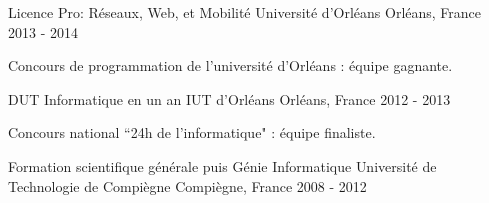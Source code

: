 \begin{cventries}
  \cventry
    {Licence Pro: Réseaux, Web, et Mobilité}
    {Université d'Orléans}
    {Orléans, France}
    {2013 - 2014}
    {
      \begin{cvitems}
        \item {Concours de programmation de l'université d'Orléans : équipe gagnante.}
      \end{cvitems}
    }
  \cventry
    {DUT Informatique en un an}
    {IUT d'Orléans}
    {Orléans, France}
    {2012 - 2013}
    {
      \begin{cvitems}
        \item {Concours national ``24h de l'informatique" : équipe finaliste.}
      \end{cvitems}
    }
  \cventry
    {Formation scientifique générale puis Génie Informatique}
    {Université de Technologie de Compiègne}
    {Compiègne, France}
    {2008 - 2012}
    {}
\end{cventries}
